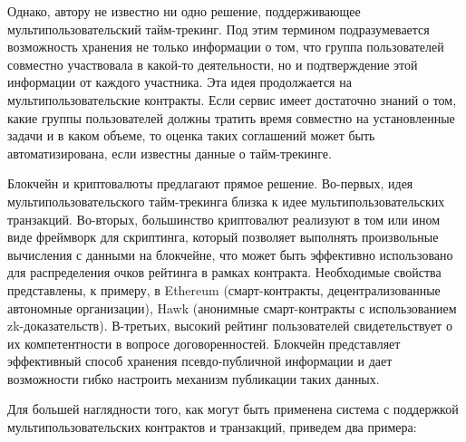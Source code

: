 \documentclass[specification,annotation]{itmo-student-thesis}
\begin{document}
Однако, автору не известно ни одно решение, поддерживающее
мультипользовательский тайм-трекинг. Под этим термином подразумевается
возможность хранения не только информации о том, что группа
пользователей совместно участвовала в какой-то деятельности, но и
подтверждение этой информации от каждого участника. Эта идея
продолжается на мультипользовательские контракты. Если сервис имеет
достаточно знаний о том, какие группы пользователей должны тратить
время совместно на установленные задачи и в каком объеме, то оценка
таких соглашений может быть автоматизирована, если известны данные о
тайм-трекинге.

Блокчейн и криптовалюты предлагают прямое решение. Во-первых, идея
мультипользовательского тайм-трекинга близка к идее
мультипользовательских транзакций. Во-вторых, большинство криптовалют
реализуют в том или ином виде фреймворк для скриптинга, который
позволяет выполнять произвольные вычисления с данными на блокчейне,
что может быть эффективно использовано для распределения очков
рейтинга в рамках контракта. Необходимые свойства представлены, к
примеру, в Ethereum \cite{ethereum} (смарт-контракты,
децентрализованные автономные организации), Hawk \cite{kosba2016hawk}
(анонимные смарт-контракты с использованием
zk-доказательств). В-третьих, высокий рейтинг пользователей
свидетельствует о их компетентности в вопросе
договоренностей. Блокчейн представляет эффективный способ хранения
псевдо-публичной информации и дает возможности гибко настроить
механизм публикации таких данных.

Для большей наглядности того, как могут быть применена система с
поддержкой мультипользовательских контрактов и транзакций, приведем
два примера:
\end{document}
